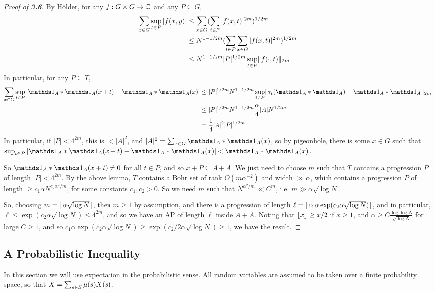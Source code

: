 \documentclass[10pt,a4paper]{article}
\let\E\relax
\DeclareMathOperator*{\E}{\raisebox{-0.45em}{\text{\huge $\mathds{E}$}}}
\begin{document}
\begin{proof}[Proof of \textbf{3.6}]
  By H\"older, for any $f: G \times G \to \mathbb{C}$ and any $P \subseteq G$,
  \begin{align*}
    \sum_{x \in G} \sup_{t \in P}|f(x,y)| &\leq \sum_{x \in G}(\sum_{t\in P}|f(x,t)|^{2m})^{1/2m} \\
    &\leq N^{1-1/2m} (\sum_{t\in P}\sum_{x\in G}|f(x,t)|^{2m})^{1/2m}\\
    &\leq N^{1-1/2m}|P|^{1/2m}\sup_{t \in P}\lVert f(\cdot,t)\rVert_{2m}
  \end{align*}
  In particular, for any $P \subseteq T$,
  \begin{align*}
    \sum_{x \in G} \sup_{t \in P}|\one_A \ast \one_A(x+t)-\one_A\ast \one_A(x)| &\leq |P|^{1/2m}N^{1-1/2m}\sup_{t \in P}\norm{\tau_t(\one_A \ast \one_A)-\one_A \ast \one_A}_{2m}\\
    &\leq |P|^{1/2m}N^{1-1/2m}\frac{\alpha}{4}|A|N^{1/2m}\\
    &= \frac14 |A|^2 |P|^{1/2m}
  \end{align*}
  In particular, if $|P| < 4^{2m}$, this is $< |A|^2$, and $|A|^2 = \sum_{x \in G} \one_A \ast \one_A(x)$, so by pigeonhole, there is some $x \in G$ such that $\sup_{t \in P} |\one_A \ast \one_A(x+t) - \one_A\ast \one_A(x)| < \one_A\ast \one_A(x)$.

  So $\one_A \ast \one_A(x+t) \neq 0$ for all $t \in P$, and so $x+P \subseteq A+A$. We just need to choose $m$ such that $T$ contains a progression $P$ of length $|P| < 4^{2m}$. By the above lemma, $T$ contains a Bohr set of rank $O(m\alpha^{-2})$ and width $\gg \alpha$, which contains a progression $P$ of length $\geq c_1 \alpha N^{c_2\alpha^2/m}$, for some constants $c_1, c_2 > 0$. So we need $m$ such that $N^{\alpha^2/m} \ll C^m$, i.e. $m \gg \alpha \sqrt{\log N}$.

  So, choosing $m = \lfloor \alpha \sqrt{\log N} \rfloor$, then $m \geq 1$ by assumption, and there is a progression of length $\ell = \lfloor c_1\alpha \exp(c_2\alpha \sqrt{\log N}) \rfloor$, and in particular, $\ell \leq \exp(c_2 \alpha \sqrt{\log N}) \leq 4^{2m}$, and so we have an AP of length $\ell$ inside $A+A$. Noting that $\lfloor x \rfloor \geq x/2$ if $x \geq 1$, and $\alpha \geq C\frac{\log\log N}{\sqrt{\log N}}$ for large $C \geq 1$, and so $c_1 \alpha \exp(c_2 \alpha \sqrt{\log N}) \geq \exp(c_2/2 \alpha \sqrt{\log N}) \geq 1$, we have the result.
\end{proof}
\subsection{A Probabilistic Inequality}
In this section we will use expectation in the probabilistic sense. All random variables are assumed to be taken over a finite probability space, so that $\E X = \sum_{s \in S} \mu(s)X(s)$.
\end{document}
